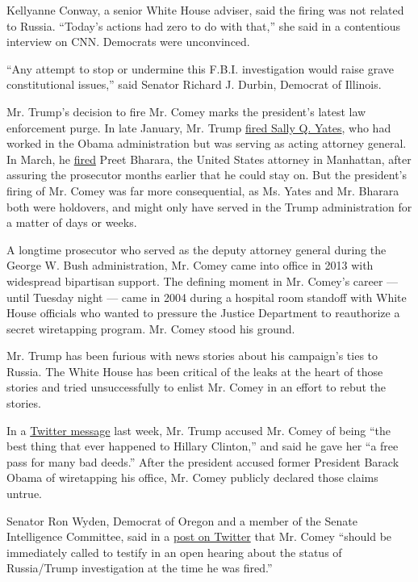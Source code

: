 Kellyanne Conway, a senior White House adviser, said the firing was not
related to Russia. ``Today's actions had zero to do with that,'' she
said in a contentious interview on CNN. Democrats were unconvinced.

``Any attempt to stop or undermine this F.B.I. investigation would raise
grave constitutional issues,'' said Senator Richard J. Durbin, Democrat
of Illinois.

Mr. Trump's decision to fire Mr. Comey marks the president's latest law
enforcement purge. In late January, Mr. Trump
\href{https://www.nytimes.com/2017/01/30/us/politics/trump-immigration-ban-memo.html}{fired
Sally Q. Yates}, who had worked in the Obama administration but was
serving as acting attorney general. In March, he
\href{https://www.nytimes.com/2017/03/11/us/politics/preet-bharara-us-attorney.html}{fired}
Preet Bharara, the United States attorney in Manhattan, after assuring
the prosecutor months earlier that he could stay on. But the president's
firing of Mr. Comey was far more consequential, as Ms. Yates and Mr.
Bharara both were holdovers, and might only have served in the Trump
administration for a matter of days or weeks.

A longtime prosecutor who served as the deputy attorney general during
the George W. Bush administration, Mr. Comey came into office in 2013
with widespread bipartisan support. The defining moment in Mr. Comey's
career --- until Tuesday night --- came in 2004 during a hospital room
standoff with White House officials who wanted to pressure the Justice
Department to reauthorize a secret wiretapping program. Mr. Comey stood
his ground.

Mr. Trump has been furious with news stories about his campaign's ties
to Russia. The White House has been critical of the leaks at the heart
of those stories and tried unsuccessfully to enlist Mr. Comey in an
effort to rebut the stories.

In a
\href{https://twitter.com/realDonaldTrump/status/859601184285491201}{Twitter
message} last week, Mr. Trump accused Mr. Comey of being ``the best
thing that ever happened to Hillary Clinton,'' and said he gave her ``a
free pass for many bad deeds.'' After the president accused former
President Barack Obama of wiretapping his office, Mr. Comey publicly
declared those claims untrue.

Senator Ron Wyden, Democrat of Oregon and a member of the Senate
Intelligence Committee, said in a
\href{https://twitter.com/RonWyden/status/862064341855686656}{post on
Twitter} that Mr. Comey ``should be immediately called to testify in an
open hearing about the status of Russia/Trump investigation at the time
he was fired.''

